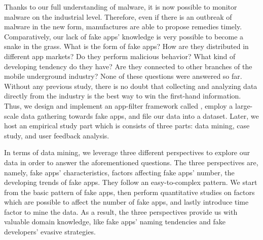 Thanks to our full understanding of malware, it is now possible to monitor malware on the industrial level.
Therefore, even if there is an outbreak of malware in the new form, manufactures are able to propose remedies timely.
Comparatively, our lack of fake apps' knowledge is very possible to become a snake in the grass.
What is the form of fake apps? How are they distributed in different app markets? Do they perform malicious behavior? What kind of developing tendency do they have? Are they connected to other branches of the mobile underground industry?
None of these questions were answered so far.
Without any previous study, there is no doubt that collecting and analyzing data directly from the industry is the best way to win the first-hand information.
Thus, we design and implement an app-filter framework called \mytool, employ a large-scale data gathering towards fake apps, and file our data into a dataset.
Later, we host an empirical study part which is consists of three parts: data mining, case study, and user feedback analysis.

In terms of data mining, we leverage three different perspectives to explore our data in order to answer the aforementioned questions.
The three perspectives are, namely, fake apps' characteristics, factors affecting fake apps' number, the developing trends of fake apps.
They follow an easy-to-complex pattern.
We start from the basic pattern of fake apps, then perform quantitative studies on factors which are possible to affect the number of fake apps, and lastly introduce time factor to mine the data.
As a result, the three perspectives provide us with valuable domain knowledge, like fake apps’ naming tendencies and fake developers’ evasive strategies.

